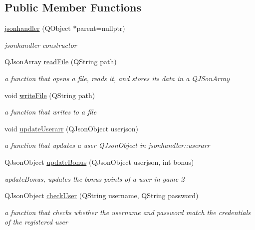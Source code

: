 \subsection*{Public Member Functions}
\begin{DoxyCompactItemize}
\item 
\hyperlink{classjsonhandler_ac54df4dbf7d14ad39c30d3b7efa8876d}{jsonhandler} (Q\+Object $\ast$parent=nullptr)
\begin{DoxyCompactList}\small\item\em jsonhandler constructor \end{DoxyCompactList}\item 
Q\+Json\+Array \hyperlink{classjsonhandler_aebc2c7497f32984133a9352d03fd06e7}{read\+File} (Q\+String path)
\begin{DoxyCompactList}\small\item\em a function that opens a file, reads it, and stores its data in a Q\+J\+Son\+Array \end{DoxyCompactList}\item 
void \hyperlink{classjsonhandler_a1439109eb8fa7fffde057548afd8e3bb}{write\+File} (Q\+String path)
\begin{DoxyCompactList}\small\item\em a function that writes to a file \end{DoxyCompactList}\item 
void \hyperlink{classjsonhandler_a254e472bc7f40602a5287015591309af}{update\+Userarr} (Q\+Json\+Object userjson)
\begin{DoxyCompactList}\small\item\em a function that updates a user Q\+Json\+Object in jsonhandler\+::userarr \end{DoxyCompactList}\item 
Q\+Json\+Object \hyperlink{classjsonhandler_a9bb2dc65754d170a493d60e82cc5ff18}{update\+Bonus} (Q\+Json\+Object userjson, int bonus)
\begin{DoxyCompactList}\small\item\em update\+Bonus, updates the bonus points of a user in game 2 \end{DoxyCompactList}\item 
Q\+Json\+Object \hyperlink{classjsonhandler_a80a0d472fc04d855cc91c3a39185d344}{check\+User} (Q\+String username, Q\+String password)
\begin{DoxyCompactList}\small\item\em a function that checks whether the username and password match the credentials of the registered user \end{DoxyCompactList}\item 

\end{DoxyCompactItemize}
